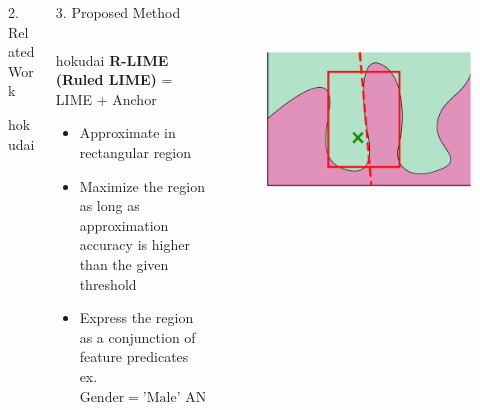 \documentclass[unicode]{beamer}
\begin{document}
\begin{frame}
\begin{columns}[t]
\begin{column}{\lcol\linewidth}
\begin{block}{2. Related Work}
{\begin{center}
\begin{beamercolorbox}[wd=0.7\textwidth,colsep=0.3cm,rounded=true,shadow=true]{hokudai}
						\end{beamercolorbox}~%
					\end{center}
				}
				\vspace{-0.25em}
			\end{block}
		\end{column}
		\begin{column}{\rcol\textwidth}
			\begin{block}{3. Proposed Method}
				\begin{columns}[]
					\begin{column}{0.6\textwidth}
						\begin{beamercolorbox}[wd=.77\textwidth,colsep=0.3cm,rounded=true,shadow=true]{hokudai}
							\textbf{R-LIME (Ruled LIME)} = LIME + Anchor
						\end{beamercolorbox}
						\vspace{0.3em}
						\begin{itemize}
							\item Approximate in rectangular region
							\item Maximize the region as long as approximation accuracy is
							      higher than the given threshold
							\item Express the region as a conjunction of feature predicates \\[0.5em]
							      \hspace{0.2em}\small{
								      ex. $\textrm{Gender} = \textrm{'Male' AND } 20\le\textrm{Age} < 30$
							      }
						\end{itemize}
					\end{column}
					\begin{column}{0.3\textwidth}
						\begin{figure}
							\includegraphics[width=\textwidth]{src/img/visual-rlime3}
						\end{figure}
					\end{column}
				\end{columns}


\end{block}
\end{column}
\end{columns}
\end{frame}
\end{document}
